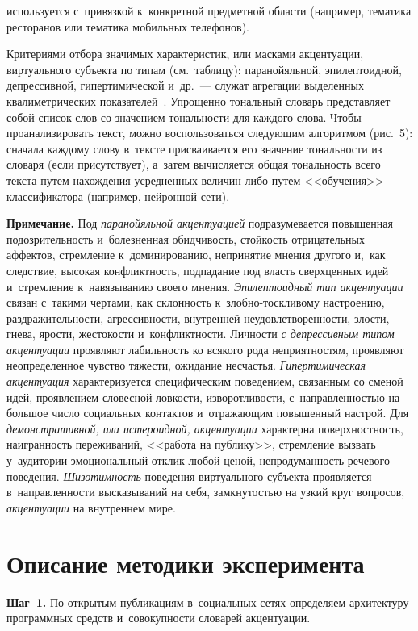 \begin{multicols}{2}


\noindent
 используется с~привязкой к~конкретной 
предметной области (например, тематика ресторанов или тематика мобильных 
телефонов).




  Критериями отбора значимых характеристик, или масками акцентуации, 
виртуального субъекта по типам (см.\ таблицу): паранойяльной, 
эпилептоидной, депрессивной, гипертимической и~др.~--- служат агрегации 
выделенных квалиметрических показателей~\cite{12-sig}. Упрощенно 
тональный словарь представляет собой список слов со значением тональности 
для каждого слова. Чтобы проанализировать текст, можно воспользоваться 
следующим алгоритмом (рис.~5): сначала каждому слову в~тексте 
присваивается его значение тональности из словаря (если присутствует), 
а~затем вычисляется общая тональность всего текста путем нахождения 
усредненных величин либо путем <<обучения>> классификатора (например, 
нейронной сети).
  
  

  {\small  \textbf{Примечание.} 
 Под \textit{паранойяльной акцентуацией} 
подразумевается повышенная подозрительность и~болезненная обидчивость, 
стойкость отрицательных аффектов, стремление к~доминированию, непринятие 
мнения другого и,~как следствие, высокая конфликтность, подпадание под 
власть сверхценных идей и~стремление к~навязыванию своего мнения. 
%
\textit{Эпилептоидный тип акцентуации} связан с~такими чертами, как 
склонность к~злоб\-но-тоск\-ли\-во\-му настроению, раздражительности, 
агрессивности, внут\-рен\-ней неудовлетворенности, злости, гнева, ярости, 
жестокости и~конфликтности.
%
 Личности \textit{с депрессивным типом 
акцентуации} проявляют лабильность ко всякого рода неприятностям, 
проявляют неопределенное чувство тяжести, ожидание несчастья. 
%
\textit{Гипертимическая акцентуация} характеризуется специфическим 
поведением, связанным со сменой идей, проявлением словесной ловкости, 
изворотливости, с~направленностью на большое число социальных контактов 
и~отражающим повышенный настрой. 
%
Для \textit{демонстративной, или 
истероидной, акцентуации} характерна поверхностность, наигранность 
переживаний, <<работа на публику>>, стремление вызвать у~аудитории
эмоциональный отклик любой ценой, непродуманность речевого поведения. 
%
\textit{Шизотимность} поведения виртуального субъекта проявляется 
в~направленности высказываний на себя, замкнутостью на узкий круг 
вопросов, \textit{акцентуации} на внутреннем мире.}
  

  
  
\section{Описание методики эксперимента}

  \noindent
  \textbf{Шаг~1.} По открытым публикациям в~социальных сетях определяем 
архитектуру программных средств и~совокупности словарей акцентуации. 

\end{multicols}




